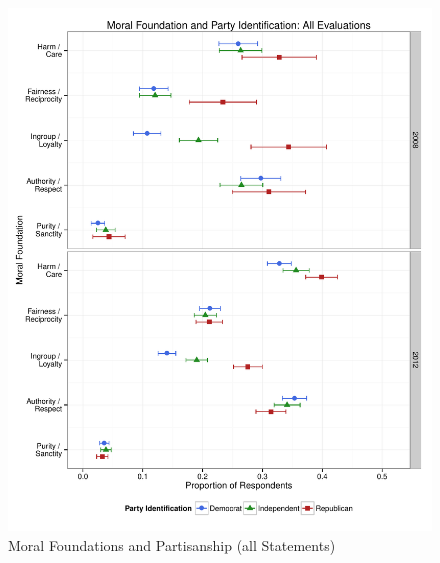 \documentclass[12pt]{article}
\begin{document}
\begin{figure}[ht]\centering
\includegraphics[scale=.4]{../calc/fig/a1_mft_pid.pdf}
\caption{Moral Foundations and Partisanship (all Statements)}\label{fig:a1_mft_pid}
\end{figure}
\end{document}
